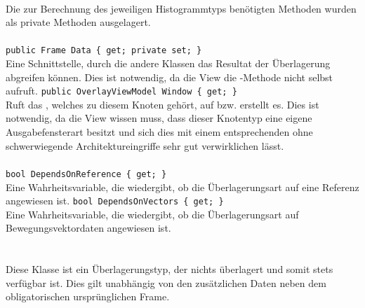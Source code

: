 \paragraph{}
\begin{itemize}
	\change Die zur Berechnung des jeweiligen Histogrammtyps benötigten Methoden wurden als private Methoden ausgelagert.
\end{itemize}

\paragraph{}
\begin{itemize}
	\add \verb!public Frame Data { get; private set; }! \\
	Eine Schnittstelle, durch die andere Klassen das Resultat der Überlagerung abgreifen können. Dies ist notwendig, da die View die -Methode nicht selbst aufruft.
	\add \verb!public OverlayViewModel Window { get; }! \\
	Ruft das , welches zu diesem Knoten gehört, auf bzw. erstellt es. Dies ist notwendig, da die View wissen muss, dass dieser Knotentyp eine eigene Ausgabefensterart besitzt und sich dies mit einem entsprechenden  ohne schwerwiegende Architektureingriffe sehr gut verwirklichen lässt.
\end{itemize}

\paragraph{}
\begin{itemize}
	\add \verb!bool DependsOnReference { get; }! \\
	Eine Wahrheitsvariable, die wiedergibt, ob die Überlagerungsart auf eine Referenz angewiesen ist.
	\add \verb!bool DependsOnVectors { get; }! \\
	Eine Wahrheitsvariable, die wiedergibt, ob die Überlagerungsart auf Bewegungsvektordaten angewiesen ist.
\end{itemize}

\paragraph{}~\\
Diese Klasse ist ein Überlagerungstyp, der nichts überlagert und somit stets verfügbar ist. Dies gilt unabhängig von den zusätzlichen Daten neben dem obligatorischen ursprünglichen Frame.
\newpage

